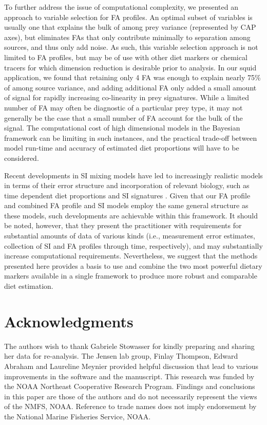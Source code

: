 \documentclass[fleqn,10pt]{wlpeerj}
\begin{document}
To further address the issue of computational complexity, we presented
an approach to variable selection for FA profiles. An optimal subset of
variables is usually one that explains the bulk of among prey variance
(represented by CAP axes), but eliminates FAs that only contribute
minimally to separation among sources, and thus only add noise. As such, this variable selection approach is not limited to FA profiles, but may be of use with other diet markers or chemical tracers for which dimension reduction is desirable prior to analysis. In our
squid application, we found that retaining only 4 FA was enough to
explain nearly 75\% of among source variance, and adding additional FA
only added a small amount of signal for rapidly increasing
co-linearity in prey signatures. While a limited number of FA may
often be diagnostic of a particular prey type, it may not generally be
the case that a small number of FA account for the bulk of the
signal. The computational cost of high dimensional models in the
Bayesian framework can be limiting in such instances, and the
practical trade-off between model run-time and accuracy of estimated
diet proportions will have to be considered.

Recent developments in SI mixing models have led to increasingly
realistic models in terms of their error structure \citep{hopkins_estimating_2012} and
incorporation of relevant biology, such as time dependent diet
proportions and SI signatures \citep{parnell_bayesian_2012}. Given that our FA profile and combined
FA profile and SI models employ the same general structure as these models,
such developments are achievable within this framework. It should be
noted, however, that they present the practitioner with requirements for substantial
amounts of data of various kinds (i.e., measurement error estimates,
collection of SI and FA profiles through time, respectively), and may
substantially increase computational requirements. Nevertheless, we
suggest that the methods presented here provides a basis to use and
combine the two most powerful dietary markers available in
a single framework to produce more robust and comparable diet estimation.


\section*{Acknowledgments}

The authors wish to thank Gabriele Stowasser for kindly preparing and sharing her data for re-analysis. The Jensen lab group, Finlay Thompson, Edward Abraham and Laureline Meynier provided helpful discussion that lead to various improvements in the software and the manuscript. This research was funded by the NOAA Northeast Cooperative Research Program.  Findings and conclusions in this paper are those of the authors and do not necessarily represent the views of the NMFS, NOAA. Reference to trade names does not imply endorsement by the National Marine Fisheries Service, NOAA.


\end{document}
